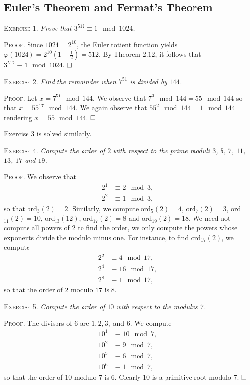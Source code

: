 \documentclass[11pt, leqno]{article}
\newcommand{\done}{\ensuremath{\hfill\square}}
\begin{document}
\subsection{Euler's Theorem and Fermat's Theorem}

\textsc{Exercise 1}. \emph{Prove that $3^{512}\equiv 1 \mod 1024$.}

\textsc{Proof}. Since $1024 = 2^{10}$, the Euler totient function yields $\displaystyle \varphi(1024) = 2^{10}\left( 1 - \frac{1}{2} \right) = 512$. By Theorem $2.12$, it follows that $3^{512} \equiv 1 \mod 1024$. \done

\textsc{Exercise 2}. \emph{Find the remainder when $7^{51}$ is divided by $144$.}

\textsc{Proof}. Let $x=7^{51} \mod 144$. We observe that $7^3\mod 144 = 55 \mod 144$ so that $x = 55^{17} \mod 144$. We again observe that $55^2 \mod 144 = 1\mod 144$ rendering $x = 55 \mod 144$. \done

Exercise 3 is solved similarly.

\textsc{Exercise 4}. \emph{Compute the order of $2$ with respect to the prime moduli $3$, $5$, $7$, $11$, $13$, $17$ and $19$.}

\textsc{Proof}. We observe that 
\begin{align*}
  2^1 &\equiv 2 \mod 3, \\
  2^2 &\equiv 1 \mod 3,
\end{align*}
so that ord$_3(2) = 2$. Similarly, we compute ord$_5(2) = 4$, ord$_7(2) = 3$, ord$_{11}(2) = 10$, ord$_{13}(12)$, ord$_{17}(2) = 8$ and ord$_{19}(2) = 18$. We need not compute all powers of $2$ to find the order, we only compute the powers whose exponents divide the modulo minus one. For instance, to find ord$_{17}(2)$, we compute 
\begin{align*}
  2^2 &\equiv 4 \mod 17, \\
  2^4 &\equiv 16 \mod 17, \\
  2^8 &\equiv 1 \mod 17,
\end{align*}
so that the order of $2$ modulo $17$ is $8$. 

\textsc{Exercise 5}. \emph{Compute the order of $10$ with respect to the modulus $7$.}

\textsc{Proof}. The divisors of $6$ are $1, 2, 3,$ and $6$. We compute 
\begin{align*}
  10^1 &\equiv 10 \mod 7, \\
  10^2 &\equiv 9 \mod 7, \\
  10^3 &\equiv 6 \mod 7, \\
  10^6 &\equiv 1 \mod 7,
\end{align*}
so that the order of $10$ modulo $7$ is $6$. Clearly $10$ is a primitive root modulo $7$. \done
\end{document}
